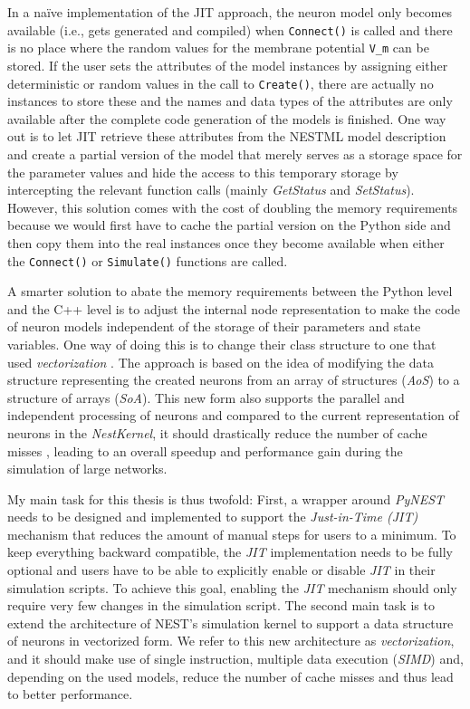 In a na\"ive implementation of the JIT approach, the neuron model only becomes available (i.e., gets generated and compiled) when \texttt{Connect()} is called and there is no place where the random values for the membrane potential \texttt{V\_m} can be stored. If the user sets the attributes of the model instances by assigning either deterministic or random values in the call to \texttt{Create()}, there are actually no instances to store these and the names and data types of the attributes are only available after the complete code generation of the models is finished. One way out is to let JIT retrieve these attributes from the NESTML model description and create a partial version of the model that merely serves as a storage space for the parameter values and hide the access to this temporary storage by intercepting the relevant function calls (mainly \emph{GetStatus} and \emph{SetStatus}). However, this solution comes with the cost of doubling the memory requirements because we would first have to cache the partial version on the Python side and then copy them into the real instances once they become available when either the \texttt{Connect()} or \texttt{Simulate()} functions are called.

A smarter solution to abate the memory requirements between the Python level and the C++ level is to adjust the internal node representation to make the code of neuron models independent of the storage of their parameters and state variables. One way of doing this is to change their class structure to one that used \emph{vectorization} \citep{nuzman2006auto}. The approach is based on the idea of modifying the data structure representing the created neurons from an array of structures (\emph{AoS}) to a structure of arrays (\emph{SoA}). This new form also supports the parallel and independent processing of neurons and compared to the current representation of neurons in the \emph{NestKernel}, it should drastically reduce the number of cache misses \citep{ghosh1997cache}, leading to an overall speedup and performance gain during the simulation of large networks.

My main task for this thesis is thus twofold: First, a wrapper around \emph{PyNEST} needs to be designed and implemented to support the \emph{Just-in-Time (JIT)} mechanism that reduces the amount of manual steps for users to a minimum. To keep everything backward compatible, the \emph{JIT} implementation needs to be fully optional and users have to be able to explicitly enable or disable \emph{JIT} in their simulation scripts. To achieve this goal, enabling the \emph{JIT} mechanism should only require very few changes in the simulation script. The second main task is to extend the architecture of NEST's simulation kernel to support a data structure of neurons in vectorized form. We refer to this new architecture as \emph{vectorization}, and it should make use of single instruction, multiple data execution (\emph{SIMD}) and, depending on the used models, reduce the number of cache misses and thus lead to better performance.

